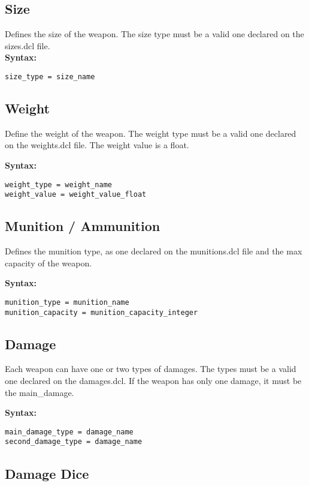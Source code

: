 \documentclass[letterpaper,12pt]{article}
\begin{document}
\subsection{Size}

Defines the size of the weapon. The size type must be a valid one
declared on the sizes.dcl file.\\

{\bf Syntax: }
\begin{verbatim}
size_type = size_name
\end{verbatim}

\subsection{Weight}

Define the weight of the weapon. The weight type must be a valid one declared
on the weights.dcl file. The weight value is a float.

{\bf Syntax:}
\begin{verbatim}
weight_type = weight_name
weight_value = weight_value_float
\end{verbatim}

\subsection{Munition / Ammunition}

Defines the munition type, as one declared on the munitions.dcl file and the
max capacity of the weapon.

{\bf Syntax:}
\begin{verbatim}
munition_type = munition_name
munition_capacity = munition_capacity_integer
\end{verbatim}

\subsection{Damage}

Each weapon can have one or two types of damages. The types must be a valid one
declared on the damages.dcl. If the weapon has only one damage, it must be the
main\_damage.

{\bf Syntax:}
\begin{verbatim}
main_damage_type = damage_name
second_damage_type = damage_name
\end{verbatim}

\subsection{Damage Dice}
\end{document}
